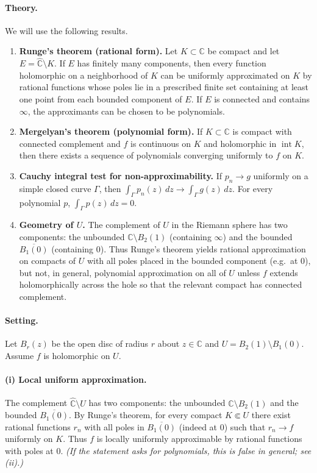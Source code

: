 \documentclass[12pt,a4paper]{article}
\theoremstyle{plain}
\theoremstyle{definition}
\theoremstyle{remark}
\theoremstyle{remark}
\begin{document}
\paragraph{Theory.}
We will use the following results.
\begin{enumerate}[label=(\alph*), leftmargin=*, itemsep=0.4em]
	\item \textbf{Runge’s theorem (rational form).}
	Let $K\subset\mathbb C$ be compact and let $E=\widehat{\mathbb C}\setminus K$.
	If $E$ has finitely many components, then every function holomorphic on a neighborhood
	of $K$ can be uniformly approximated on $K$ by rational functions whose poles lie in a
	prescribed finite set containing at least one point from each bounded component of $E$.
	If $E$ is connected and contains $\infty$, the approximants can be chosen to be polynomials.
	\item \textbf{Mergelyan’s theorem (polynomial form).}
	If $K\subset\mathbb C$ is compact with connected complement and $f$ is continuous on $K$
	and holomorphic in $\operatorname{int}K$, then there exists a sequence of polynomials
	converging uniformly to $f$ on $K$.
	\item \textbf{Cauchy integral test for non-approximability.}
	If $p_n\to g$ uniformly on a simple closed curve $\Gamma$, then
	$\int_\Gamma p_n(z)\,dz\to\int_\Gamma g(z)\,dz$.
	For every polynomial $p$, $\int_\Gamma p(z)\,dz=0$.
	\item \textbf{Geometry of $U$.}
	The complement of $U$ in the Riemann sphere has two components:
	the unbounded $\mathbb C\setminus B_2(1)$ (containing $\infty$) and the bounded
	$\overline{B_1(0)}$ (containing $0$). Thus Runge’s theorem yields rational
	approximation on compacts of $U$ with all poles placed in the bounded component
	(e.g.\ at $0$), but not, in general, polynomial approximation on all of $U$ unless
	$f$ extends holomorphically across the hole so that the relevant compact has
	connected complement.
\end{enumerate}

\paragraph{Setting.}
Let $B_r(z)$ be the open disc of radius $r$ about $z\in\mathbb C$ and
$U=B_2(1)\setminus B_1(0)$. Assume $f$ is holomorphic on $U$.

\paragraph{(i) Local uniform approximation.}
The complement $\widehat{\mathbb C}\setminus U$ has two components:
the unbounded $\mathbb C\setminus B_2(1)$ and the bounded $\overline{B_1(0)}$.
By Runge’s theorem, for every compact $K\Subset U$ there exist rational functions $r_n$
with all poles in $\overline{B_1(0)}$ (indeed at $0$) such that $r_n\to f$
uniformly on $K$. Thus $f$ is locally uniformly approximable by rational functions with poles at $0$.
\emph{(If the statement asks for polynomials, this is false in general; see (ii).)}
\end{document}
